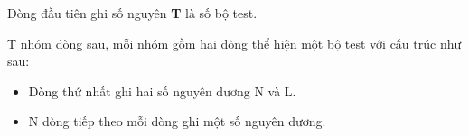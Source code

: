 Dòng đầu tiên ghi số nguyên   \textbf{    T   }   là số bộ test.  

   T nhóm dòng sau, mỗi nhóm gồm hai dòng thể hiện một bộ test với cấu trúc như sau:   
\begin{itemize}
	\item     Dòng thứ nhất ghi hai số nguyên dương N và L.   
	\item     N dòng tiếp theo mỗi dòng ghi một số nguyên dương.   
\end{itemize}